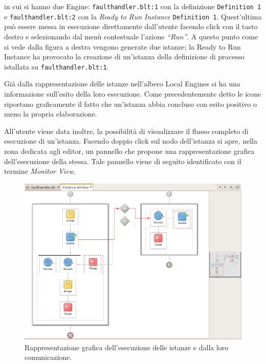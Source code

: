 \vspace{0.5cm}
in cui si hanno due Engine: \texttt{faulthandler.blt:1} con la definizione
\texttt{Definition 1} e \texttt{faulthandler.blt:2} con la \emph{Ready to Run
Instance} \texttt{Definition 1}. Quest'ultima può essere messa in esecuzione
direttamente dall'utente facendo click con il tasto destro e selezionando dal
menù contestuale l'azione \emph{``Run''}. A questo punto come si vede dalla
figura a destra vengono generate due istanze; la Ready to Run Instance ha
provocato la creazione di un'istanza della definizione di processo istallata su
\texttt{faulthandler.blt:1}.

Già dalla rappresentazione delle istanze nell'albero Local Engines si ha una
informazione sull'esito della loro esecuzione. Come precedentemente detto
le icone riportano graficamente il fatto che un'istanza abbia concluso con
esito positivo o meno la propria elaborazione. 

All'utente viene data inoltre, la possibilità di visualizzare il flusso
completo di esecuzione di un'istanza. Facendo doppio click sul nodo
dell'istanza si apre, nella zona dedicata agli editor, un pannello
che propone una rappresentazione grafica dell'esecuzione della stessa. Tale
pannello viene di seguito identificato con il termine \emph{Monitor View}.

\begin{figure}[p]
\begin{center}
\includegraphics[scale=0.65,angle=90]
{blide/dia/BlideMonitor1}
\caption[Blide: rappresentazione grafica di istanze]{Rappresentazione grafica
dell'esecuzione delle istanze e dalla loro comunicazione.}
  \label{fig:blideMonitor1}
\end{center}
\end{figure}

